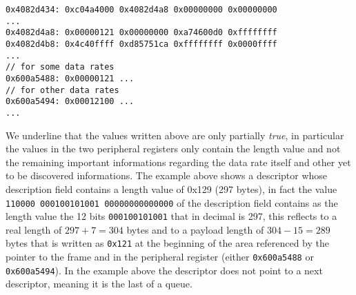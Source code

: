 \newsavebox{\memdescriptor}
\begin{lrbox}{\memdescriptor}
\begin{lstlisting}
0x4082d434: 0xc04a4000 0x4082d4a8 0x00000000 0x00000000
...
0x4082d4a8: 0x00000121 0x00000000 0xa74600d0 0xffffffff
0x4082d4b8: 0x4c40ffff 0xd85751ca 0xffffffff 0x0000ffff
...
// for some data rates
0x600a5488: 0x00000121 ...
// for other data rates
0x600a5494: 0x00012100 ...
...
\end{lstlisting}
\end{lrbox}
\usebox{\memdescriptor}

We underline that the values written above are only partially \textit{true},
in particular the values in the two peripheral registers only contain the length value
and not the remaining important informations regarding the data rate itself and 
other yet to be discovered informations.  
The example above shows a descriptor whose description field contains a length value
of 0x129 (297 bytes), in fact the value 
\texttt{110000 000100101001 00000000000000} of the description field contains
as the length value the 12 bits \texttt{000100101001} that in decimal is 297,
this reflects to a real length of $297+7=304$ bytes and to a payload length of $304-15=289$ bytes
that is written as \texttt{0x121} at the beginning of the area referenced by the pointer to the frame and 
in the peripheral register (either \texttt{0x600a5488} or \texttt{0x600a5494}).
In the example above the descriptor does not point to a next descriptor, meaning it is the last
of a queue.
